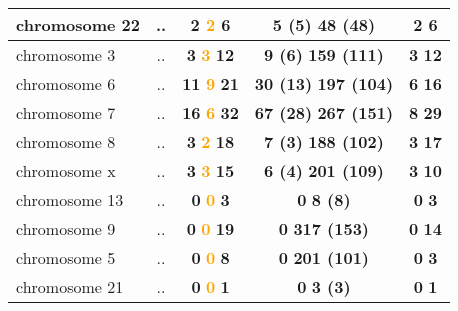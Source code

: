 \begin{table}[H]
\begin{tabular}{||l|c|c|c|c||}
\hline
chromosome 22&..&\textcolor{vert}{\textbf{2}} \textcolor{orange}{\textbf{2}} \textcolor{rose}{\textbf{6}} &\textcolor{vert}{\textbf{5 (5)}} \textcolor{rose}{\textbf{48 (48)}} &\textcolor{vert}{\textbf{2}} \textcolor{rose}{\textbf{6}} \\
\hline
chromosome 3&..&\textcolor{vert}{\textbf{3}} \textcolor{orange}{\textbf{3}} \textcolor{rose}{\textbf{12}} &\textcolor{vert}{\textbf{9 (6)}} \textcolor{rose}{\textbf{159 (111)}} &\textcolor{vert}{\textbf{3}} \textcolor{rose}{\textbf{12}} \\
\hline
chromosome 6&..&\textcolor{vert}{\textbf{11}} \textcolor{orange}{\textbf{9}} \textcolor{rose}{\textbf{21}} &\textcolor{vert}{\textbf{30 (13)}} \textcolor{rose}{\textbf{197 (104)}} &\textcolor{vert}{\textbf{6}} \textcolor{rose}{\textbf{16}} \\
\hline
chromosome 7&..&\textcolor{vert}{\textbf{16}} \textcolor{orange}{\textbf{6}} \textcolor{rose}{\textbf{32}} &\textcolor{vert}{\textbf{67 (28)}} \textcolor{rose}{\textbf{267 (151)}} &\textcolor{vert}{\textbf{8}} \textcolor{rose}{\textbf{29}} \\
\hline
chromosome 8&..&\textcolor{vert}{\textbf{3}} \textcolor{orange}{\textbf{2}} \textcolor{rose}{\textbf{18}} &\textcolor{vert}{\textbf{7 (3)}} \textcolor{rose}{\textbf{188 (102)}} &\textcolor{vert}{\textbf{3}} \textcolor{rose}{\textbf{17}} \\
\hline
chromosome x&..&\textcolor{vert}{\textbf{3}} \textcolor{orange}{\textbf{3}} \textcolor{rose}{\textbf{15}} &\textcolor{vert}{\textbf{6 (4)}} \textcolor{rose}{\textbf{201 (109)}} &\textcolor{vert}{\textbf{3}} \textcolor{rose}{\textbf{10}} \\
\hline
chromosome 13&..&\textcolor{vert}{\textbf{0}} \textcolor{orange}{\textbf{0}} \textcolor{rose}{\textbf{3}} &\textcolor{vert}{\textbf{0}} \textcolor{rose}{\textbf{8 (8)}} &\textcolor{vert}{\textbf{0}} \textcolor{rose}{\textbf{3}} \\
\hline
chromosome 9&..&\textcolor{vert}{\textbf{0}} \textcolor{orange}{\textbf{0}} \textcolor{rose}{\textbf{19}} &\textcolor{vert}{\textbf{0}} \textcolor{rose}{\textbf{317 (153)}} &\textcolor{vert}{\textbf{0}} \textcolor{rose}{\textbf{14}} \\
\hline
chromosome 5&..&\textcolor{vert}{\textbf{0}} \textcolor{orange}{\textbf{0}} \textcolor{rose}{\textbf{8}} &\textcolor{vert}{\textbf{0}} \textcolor{rose}{\textbf{201 (101)}} &\textcolor{vert}{\textbf{0}} \textcolor{rose}{\textbf{3}} \\
\hline
chromosome 21&..&\textcolor{vert}{\textbf{0}} \textcolor{orange}{\textbf{0}} \textcolor{rose}{\textbf{1}} &\textcolor{vert}{\textbf{0}} \textcolor{rose}{\textbf{3 (3)}} &\textcolor{vert}{\textbf{0}} \textcolor{rose}{\textbf{1}} \\

\end{tabular}
\end{table}
